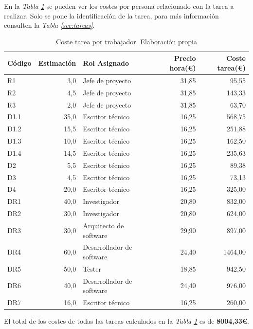 \documentclass[12pt]{article}
\begin{document}
    En la \textit{Tabla \ref{tab:costo_personal}} se pueden ver los costes por persona relacionado con la tarea a realizar. Solo se pone la identificación de la tarea, para más información consulten la \textit{Tabla \ref{sec:tareas}}.
    \begin{table}[H]
    \begin{center}
        \begin{tabular}{ |l|r|l|r|r| } \hline
            Código& Estimación & Rol Asignado              & Precio hora(\euro)  & Coste tarea(\euro)  \\ \hline
            R1   & 3,0         & Jefe de proyecto          & 31,85        & 95,55        \\ \hline
            R2   & 4,5         & Jefe de proyecto          & 31,85        & 143,33       \\ \hline
            R3   & 2,0         & Jefe de proyecto          & 31,85        & 63,70        \\ \hline
            D1.1 & 35,0        & Escritor técnico          & 16,25        & 568,75       \\ \hline
            D1.2 & 15,5        & Escritor técnico          & 16,25        & 251,88       \\ \hline
            D1.3 & 10,0        & Escritor técnico          & 16,25        & 162,50       \\ \hline
            D1.4 & 14,5        & Escritor técnico          & 16,25        & 235,63       \\ \hline
            D2   & 5,5         & Escritor técnico          & 16,25        & 89,38        \\ \hline
            D3   & 4,5         & Escritor técnico          & 16,25        & 73,13        \\ \hline
            D4   & 20,0        & Escritor técnico          & 16,25        & 325,00       \\ \hline
            DR1  & 40,0        & Investigador              & 20,80        & 832,00       \\ \hline
            DR2  & 30,0        & Investigador              & 20,80        & 624,00       \\ \hline
            DR3  & 30,0        & Arquitecto de software    & 29,90        & 897,00       \\ \hline
            DR4  & 60,0        & Desarrollador de software & 24,40        & 1464,00      \\ \hline
            DR5  & 50,0        & Tester                    & 18,85        & 942,50       \\ \hline
            DR6  & 40,0        & Desarrollador de software & 24,40        & 976,00       \\ \hline
            DR7  & 16,0        & Escritor técnico          & 16,25        & 260,00       \\ \hline      
        \end{tabular}
    \caption{Coste tarea por trabajador. Elaboración propia}
    \label{tab:costo_personal}
    \end{center}
  \end{table}
  El total de los costes de todas las tareas calculados en la \textit{Tabla \ref{tab:costo_personal}} es de \textbf{8004,33\euro}.  
\end{document}
